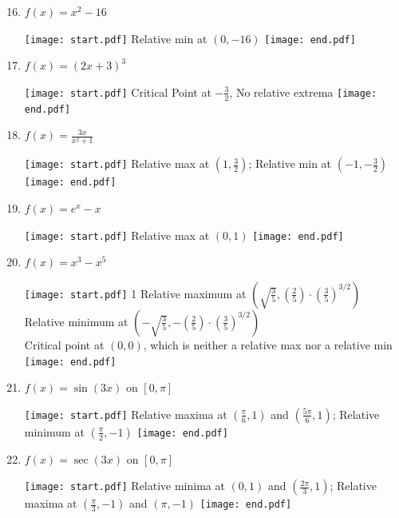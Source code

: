 \documentclass[12pt]{article}
\begin{document}

\begin{enumerate}
\setcounter{enumi}{15}

\item $f(x) = x^2-16$ 

\texttt{[image: start.pdf]}
{{Relative min at $(0,-16)$}}
\texttt{[image: end.pdf]}


\item $f(x) = (2x+3)^3$ 

\texttt{[image: start.pdf]}
{{Critical Point at $-\frac{3}{2}$, No relative extrema}}
\texttt{[image: end.pdf]}


\item $f(x) = \frac{3x}{x^2+1}$ 

\texttt{[image: start.pdf]}
{{Relative max at $\left(1,\frac{3}{2}\right)$; Relative min at $\left(-1,-\frac{3}{2}\right)$}}
\texttt{[image: end.pdf]}


\item $f(x) = e^x-x$ 

\texttt{[image: start.pdf]}
{{Relative max at $(0,1)$}}
\texttt{[image: end.pdf]}


\item $f(x) = x^3-x^5$ 

\texttt{[image: start.pdf]}
{{{1\linewidth}{
Relative maximum at $\left(\sqrt{\frac{3}{5}},\left(\frac{2}{5}\right) \cdot \left(\frac{3}{5}\right)^{3/2}\right)$\\
Relative minimum at $\left(-\sqrt{\frac{3}{5}},-\left(\frac{2}{5}\right) \cdot \left(\frac{3}{5}\right)^{3/2}\right)$\\
Critical point at $(0,0)$, which is neither a relative max nor a relative min}}}
\texttt{[image: end.pdf]}


\end{enumerate}


\begin{enumerate}
\setcounter{enumi}{20}

\item $f(x) = \sin{(3x)}$ on $[0,\pi]$ 

\texttt{[image: start.pdf]}
{{Relative maxima at $\left(\frac{\pi}{6},1\right)$ and $\left(\frac{5\pi}{6},1\right)$; Relative minimum at $\left(\frac{\pi}{2},-1\right)$}}
\texttt{[image: end.pdf]}


\item $f(x) = \sec{(3x)}$ on $[0,\pi]$ 

\texttt{[image: start.pdf]}
{{Relative minima at $(0,1)$ and $\left(\frac{2\pi}{3},1\right)$; Relative maxima at $\left(\frac{\pi}{3},-1\right)$ and $(\pi,-1)$}}
\texttt{[image: end.pdf]}


\end{enumerate}
\end{document}
